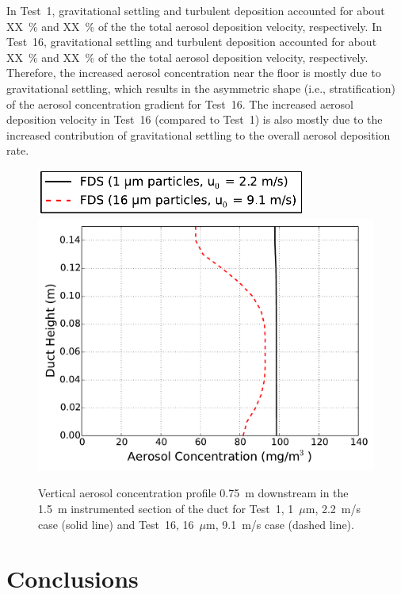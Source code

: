In Test~1, gravitational settling and turbulent deposition accounted for about XX~\% and XX~\% of the the total aerosol deposition velocity, respectively. In Test~16, gravitational settling and turbulent deposition accounted for about XX~\% and XX~\% of the the total aerosol deposition velocity, respectively. Therefore, the increased aerosol concentration near the floor is mostly due to gravitational settling, which results in the asymmetric shape (i.e., stratification) of the aerosol concentration gradient for Test~16. The increased aerosol deposition velocity in Test~16 (compared to Test~1) is also mostly due to the increased contribution of gravitational settling to the overall aerosol deposition rate.

\begin{figure}[!ht]
\centering
\includegraphics[width=3.5in]{Fig_Sippola_Aerosol_Deposition_Transverse_Legend.pdf}
\includegraphics[width=5.0in]{Fig_Sippola_Aerosol_Deposition_Transverse_Concentration.pdf}
\caption[Vertical aerosol concentration profile, Sippola Aerosol Deposition]
{Vertical aerosol concentration profile 0.75~m downstream in the 1.5~m instrumented section of the duct for Test~1, 1~$\mu$m, 2.2~m/s case (solid line) and Test~16, 16~$\mu$m, 9.1~m/s case (dashed line).}
\label{fig:Sippola_Transverse_Concentration}
\end{figure}

\section{Conclusions}
\label{sec:Conclusions}

